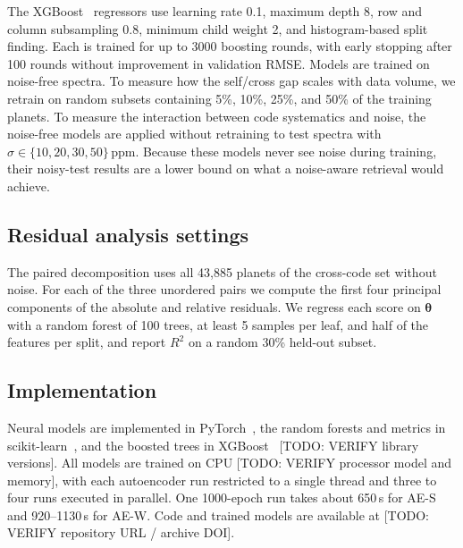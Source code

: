 The XGBoost~\cite{TODO_chen_xgboost} regressors use learning rate 0.1, maximum depth 8, row and column subsampling 0.8, minimum child weight 2, and histogram-based split finding.
Each is trained for up to 3000 boosting rounds, with early stopping after 100 rounds without improvement in validation RMSE.
Models are trained on noise-free spectra.
To measure how the self/cross gap scales with data volume, we retrain on random subsets containing 5\%, 10\%, 25\%, and 50\% of the training planets.
To measure the interaction between code systematics and noise, the noise-free models are applied without retraining to test spectra with $\sigma\in\{10,20,30,50\}\,\mathrm{ppm}$.
Because these models never see noise during training, their noisy-test results are a lower bound on what a noise-aware retrieval would achieve.

\subsection{Residual analysis settings}
\label{sec:ressetup}

The paired decomposition uses all 43{,}885 planets of the cross-code set without noise.
For each of the three unordered pairs we compute the first four principal components of the absolute and relative residuals.
We regress each score on $\bm{\theta}$ with a random forest of 100 trees, at least 5 samples per leaf, and half of the features per split, and report $R^2$ on a random 30\% held-out subset.

\subsection{Implementation}
\label{sec:impl}

Neural models are implemented in PyTorch~\cite{TODO_paszke_pytorch}, the random forests and metrics in scikit-learn~\cite{TODO_pedregosa_sklearn}, and the boosted trees in XGBoost~\cite{TODO_chen_xgboost} [TODO: VERIFY library versions].
All models are trained on CPU [TODO: VERIFY processor model and memory], with each autoencoder run restricted to a single thread and three to four runs executed in parallel.
One 1000-epoch run takes about 650\,s for AE-S and 920--1130\,s for AE-W.
Code and trained models are available at [TODO: VERIFY repository URL / archive DOI].

